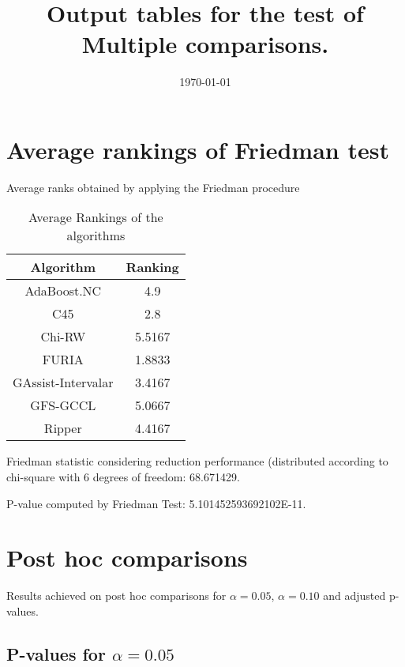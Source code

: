 \documentclass[a4paper,10pt]{article}
\title{Output tables for the test of Multiple comparisons.}
\author{}
\date{\today}
\begin{document}
\pagestyle{empty}
\maketitle
\thispagestyle{empty}
\section{Average rankings of Friedman test}



Average ranks obtained by applying the Friedman procedure

\begin{table}[!htp]
\centering
\begin{tabular}{|c|c|}\hline
Algorithm&Ranking\\\hline
 AdaBoost.NC  & 4.9\\
 C45  & 2.8\\
 Chi-RW  & 5.5167\\
 FURIA  & 1.8833\\
 GAssist-Intervalar  & 3.4167\\
 GFS-GCCL  & 5.0667\\
 Ripper & 4.4167\\
\hline
\end{tabular}
\caption{Average Rankings of the algorithms}
\end{table}

Friedman statistic considering reduction performance (distributed according to chi-square with 6 degrees of freedom: 68.671429.

P-value computed by Friedman Test: 5.101452593692102E-11.\newline



\pagebreak

\section{Post hoc comparisons}

Results achieved on post hoc comparisons for $\alpha = 0.05$, $\alpha = 0.10$ and adjusted p-values.

\subsection{P-values for $\alpha=0.05$}
\end{document}
